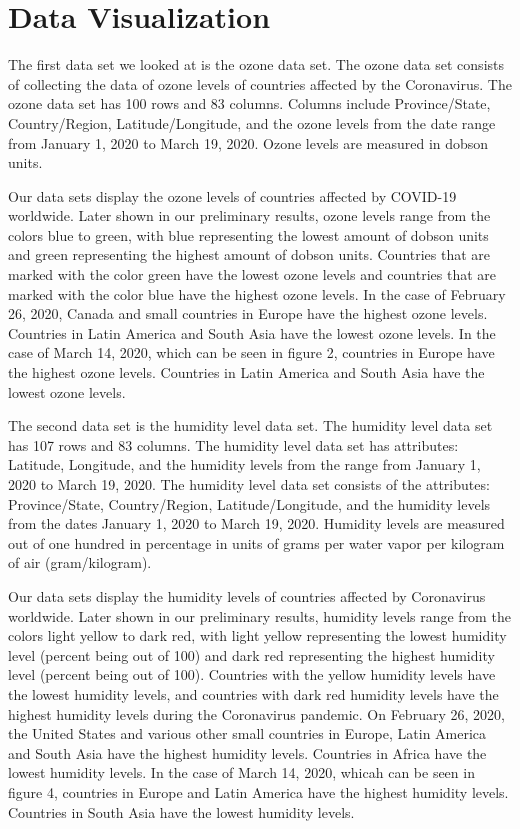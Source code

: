 \documentclass[10pt,journal,compsoc]{IEEEtran}
\begin{document}
{{\section{Data Visualization}\label{sec:data visualization}

	The first data set we looked at is the ozone data set. \cite{eeemonts-2020} The ozone data set consists of collecting the data of ozone levels of countries affected by the Coronavirus. The ozone data set has 100 rows and 83 columns. Columns include Province/State, Country/Region, Latitude/Longitude, and the ozone levels from the date range from January 1, 2020 to March 19, 2020. Ozone levels are measured in dobson units.

	 Our data sets display the ozone levels of countries affected by COVID-19 worldwide. Later shown in our preliminary results, ozone levels range from the colors blue to green, with blue representing the lowest amount of dobson units and green representing the highest amount of dobson units. Countries that are marked with the color green have the lowest ozone levels and countries that are marked with the color blue have the highest ozone levels. In the case of February 26, 2020, Canada and small countries in Europe have the highest ozone levels. Countries in Latin America and South Asia have the lowest ozone levels. In the case of March 14, 2020, which can be seen in figure 2, countries in Europe have the highest ozone levels. Countries in Latin America and South Asia have the lowest ozone levels.

	The second data set is the humidity level data set. \cite{eeemonts-2020} The humidity level data set has 107 rows and 83 columns. The humidity level data set has attributes: Latitude, Longitude, and the humidity levels from the range from January 1, 2020 to March 19, 2020. The humidity level data set consists of the attributes: Province/State, Country/Region, Latitude/Longitude, and the humidity levels from the dates January 1, 2020 to March 19, 2020. Humidity levels are measured out of one hundred in percentage in units of grams per water vapor per kilogram of air (gram/kilogram).

	Our data sets display the humidity levels of countries affected by Coronavirus worldwide. Later shown in our preliminary results, humidity levels range from the colors light yellow to dark red, with light yellow representing the lowest humidity level (percent being out of 100) and dark red representing the highest humidity level (percent being out of 100). Countries with the yellow humidity levels have the lowest humidity levels, and countries with dark red humidity levels have the highest humidity levels during the Coronavirus pandemic. On February 26, 2020, the United States and various other small countries in Europe, Latin America and South Asia have the highest humidity levels. Countries in Africa have the lowest humidity levels. In the case of March 14, 2020, whicah can be seen in figure 4, countries in Europe and Latin America have the highest humidity levels. Countries in South Asia have the lowest humidity levels.

}}
\end{document}
